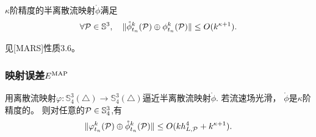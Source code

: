 \begin{prop}
  $\kappa$阶精度的半离散流映射$\mathring{\phi}$满足
  \begin{equation}
    \label{eq:1}
    \forall {\cal P} \in \mathbb{S}^3,\quad
    \lVert \mathring{\phi}^k_{t_n}({\cal P})\oplus
    \phi^k_{t_n}({\cal P})\rVert \leq O(k^{\kappa +1}).
  \end{equation}
\end{prop}
\begin{pro}
  见[MARS]\cite{zhang2016mars}性质3.6。
\end{pro}

\subsubsection{映射误差$E^{\textmd{MAP}}$}
\label{sec:拟合误差}



\begin{lem}\label{lem:maperror}
  用离散流映射$\varphi:\mathbb{S}^3_4(\triangle)\rightarrow
 \mathbb{S}^3_4(\triangle)$逼近半离散流映射$\mathring{\phi}$.
 若流速场光滑，
 $\mathring{\phi}$是$\kappa$阶精度的。
  则对任意的${\cal P}\in \mathbb{S}^3_4$,有
  \begin{equation}\label{equ:dis-semi}
    \lVert \varphi^k_{t_n}({\cal P})\oplus
    \mathring{\phi}^k_{t_n}({\cal P})\rVert
    \leq O(kh^4_{L,{\cal P}}+k^{\kappa +1}).
  \end{equation}
\end{lem}

